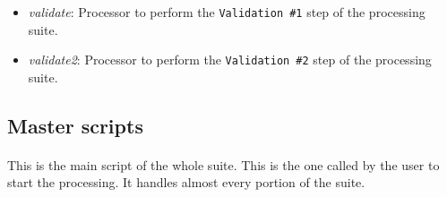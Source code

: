 \documentclass[12pt]{article}
\begin{document}
\begin{itemize}
\begin{itemize}
\begin{itemize}
			\item create\_bench\_apply\_mac.py: Creates RAT macro to run benchmarking - loads the new constants and applies on laserball run.
			\item create\_pca\_proc\_mac.py: Creates RAT macro to run PCA processor for given dataset.
			\item delete\_old\_couchdb.py: Helper script to delete CouchDB documents by type.
			\item get\_belly\_fibres.py: Helper script to create ratDB file containing the list of fibres affected by belly plates (loaded from couchDB document).
			\item load\_db.py: Helper script to load default fibre directions from ratDB.
			\item make\_ratdb\_table.py: Creates ratDB table from PCA table. This is loaded by the PCA processor to apply corrections to hit times.
			\item master.py: The brain of operations. See Subsection~\ref{sub:master}.
			\item upload\_bench.py: Parses data from benchmark comparison scripts and uploads a couchDB document.
			\item upload\_env.py: Parses the environment variables and uploads a couchDB document.
			\item upload\_fits.py: Parses the data from fits and uploads a couchDB document.
			\item upload\_radtb.py: Uploads ratDB table to postgres. 
			\item upload\_val1.py: Parses the data from \texttt{Validation \#1} step and uploads a couchDB document.
			\item upload\_val2.py: Parses the data from \texttt{Validation \#2} step and uploads a couchDB document.
		\end{itemize}
		\item \textit{validate}: Processor to perform the \texttt{Validation \#1} step of the processing suite.
		\item \textit{validate2}: Processor to perform the \texttt{Validation \#2} step of the processing suite.
	\end{itemize}
\end{itemize}

\clearpage

\subsection{Master scripts}\label{sub:master}
\paragraph{}
This is the main script of the whole suite. This is the one called by the user to start the processing. It handles almost every portion of the suite.
\end{document}
